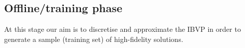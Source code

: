 \documentclass[../main.tex]{subfiles}
\begin{document}
\subsection{Offline/training phase}\label{subsec:offline}
At this stage our aim is to discretise and approximate the IBVP in order to generate a sample (training set) of high-fidelity solutions.



\end{document}
